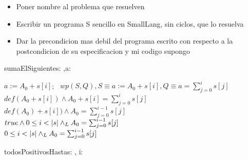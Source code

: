 \documentclass[10pt,a4paper]{article}
\begin{document}
\begin{itemize}
    \item Poner nombre al problema que resuelven
    \item Escribir un programa S sencillo en SmallLang, sin ciclos, que lo resuelva
    \item Dar la precondicion mas debil del programa escrito con respecto a la postcondicion de su especificacion {\color{red} y mi codigo supongo}
\end{itemize}
\begin{proc}{\color{red}sumaElSiguiente}{\In s: \TLista{\ent},\Inout a: \ent}{}
\end{proc}
\begin{algorithm*}[H]
    $a:=A_0+s[i]$;\
    \BlankLine
    $wp(S,Q), S\equiv a:=A_0+s[i], Q\equiv a=\sum_{j=0}^{i}s[j]$\\
    $def(A_0+s[i])\land A_0+s[i]=\sum_{j=0}^{i}s[j]$\\
    $def(A_0)+s[i])\land A_0=\sum_{j=0}^{i-1}s[j]$\\
    $true\land 0\leq i <|s| \yLuego A_0=\sum_{j=0}^{i-1}s[j]$\\
    $0\leq i <|s| \yLuego A_0=\sum_{j=0}^{i-1}s[j]$
\end{algorithm*}
\begin{proc}{\color{red}todosPositivosHasta}{\In s: \TLista{\ent}, \In i: \ent}{\bool}
    \asegura{res=true \sii \paraTodo[unalinea]{j}{\ent}{0\leq j \leq i \implicaLuego s[j]\geq 0}}
\end{proc}
\end{document}
